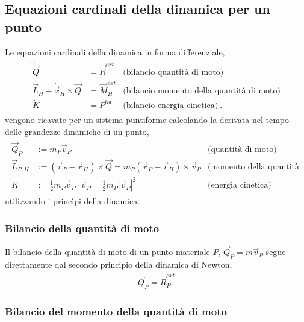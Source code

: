 \documentclass[letterpaper,10pt,italian]{jupyterBook}
\begin{document}
\subsection{Equazioni cardinali della dinamica per un punto}
\label{\detokenize{ch/mechanics/dynamics-notes:equazioni-cardinali-della-dinamica-per-un-punto}}\label{\detokenize{ch/mechanics/dynamics-notes:physics-hs-mechanics-dynamics-eom-point}}
\sphinxAtStartPar
Le equazioni cardinali della dinamica in forma differenziale,
\begin{equation*}
\begin{split}\begin{aligned}
 \dot{\vec{Q}} & = \vec{R}^{ext} & \text{(bilancio quantità di moto)} \\
 \dot{\vec{L}}_H + \dot{\vec{x}}_H \times \vec{Q} & = \vec{M}_H^{ext} & \text{(bilancio momento della quantità di moto)} \\
 \dot{K} & = P^{tot} & \text{(bilancio energia cinetica)} \ .
\end{aligned}\end{split}
\end{equation*}
\sphinxAtStartPar
vengono ricavate per un sistema puntiforme calcolando la derivata nel tempo delle grandezze dinamiche di un punto,
\begin{equation*}
\begin{split}\begin{aligned}
  \vec{Q}_P & := m_P \vec{v}_P  & \text{(quantità di moto)} \\
  \vec{L}_{P,H} & := (\vec{r}_P - \vec{r}_H) \times \vec{Q} = m_P (\vec{r}_P - \vec{r}_H) \times \vec{v}_P & \text{(momento della quantità di moto)} \\
  K & := \frac{1}{2} m_P \vec{v}_P \cdot \vec{v}_P = \frac{1}{2} m_P |\vec{v}_P|^2 & \text{(energia cinetica)}
\end{aligned}\end{split}
\end{equation*}
\sphinxAtStartPar
utilizzando i princìpi della dinamica.
\subsubsection*{Bilancio della quantità di moto}

\sphinxAtStartPar
Il bilancio della quantità di moto di un punto materiale \(P\), \(\vec{Q}_P = m \vec{v}_P\) segue direttamente dal secondo principio della dinamica di Newton,
\begin{equation*}
\begin{split}\dot{\vec{Q}}_P = \vec{R}^{ext}_P\end{split}
\end{equation*}\subsubsection*{Bilancio del momento della quantità di moto}
\end{document}
